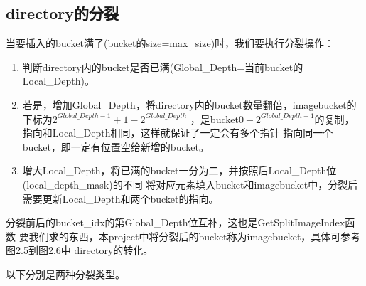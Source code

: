 \documentclass[a4paper]{article}
\begin{document}
\subsection{directory的分裂}

当要插入的bucket满了(bucket的size=max\_size)时，我们要执行分裂操作：

\begin{enumerate}
   \item 判断directory内的bucket是否已满(Global\_Depth=当前bucket的Local\_Depth)。
   \item 若是，增加Global\_Depth，将directory内的bucket数量翻倍，imagebucket的下标为$2^{Global\_Depth-1}+1-2^{Global\_Depth}$
   ，是bucket$0-2^{Global\_Depth-1}$的复制，指向和Local\_Depth相同，这样就保证了一定会有多个指针
   指向同一个bucket，即一定有位置空给新增的bucket。
   \item 增大Local\_Depth，将已满的bucket一分为二，并按照后Local\_Depth位(local\_depth\_mask)的不同
   将对应元素填入bucket和imagebucket中，分裂后需要更新Local\_Depth和两个bucket的指向。
\end{enumerate}

分裂前后的bucket\_idx的第Global\_Depth位互补，这也是GetSplitImageIndex函数
要我们求的东西，本project中将分裂后的bucket称为imagebucket，具体可参考图2.5到图2.6中
directory的转化。

以下分别是两种分裂类型。
\end{document}
